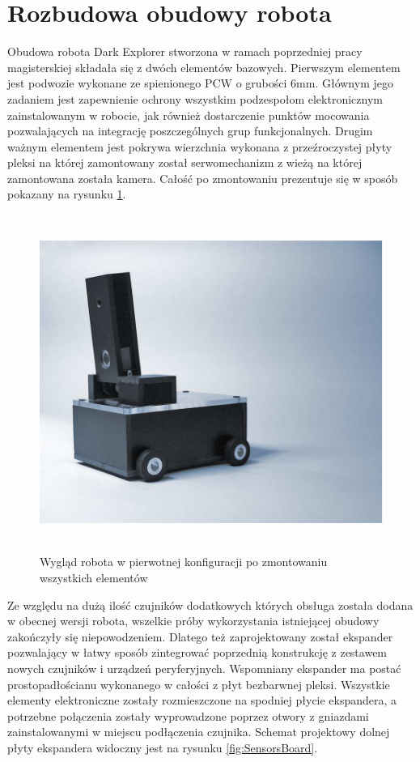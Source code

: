 \section{Rozbudowa obudowy robota}
\label{sec:casing}
Obudowa robota Dark Explorer stworzona w ramach poprzedniej pracy magisterskiej
\cite{KmakMScThesis2009} składała się z dwóch elementów bazowych. Pierwszym
elementem jest podwozie wykonane ze spienionego PCW o grubości 6mm. Głównym jego
zadaniem jest zapewnienie ochrony wszystkim podzespołom elektronicznym
zainstalowanym w robocie, jak również dostarczenie punktów mocowania
pozwalających na integrację poszczególnych grup funkcjonalnych. Drugim ważnym
elementem jest pokrywa wierzchnia wykonana z przeźroczystej płyty pleksi na
której zamontowany został serwomechanizm z wieżą na której zamontowana została
kamera. Całość po zmontowaniu prezentuje się w sposób pokazany na rysunku
\ref{fig:DESideView}.

\begin{figure}[ht!]
 \centering
 \includegraphics[height=110mm]{../images/ch04/de_side_view.png}
 \caption{Wygląd robota w pierwotnej konfiguracji po zmontowaniu wszystkich elementów}
 \label{fig:DESideView}
\end{figure}

Ze względu na dużą ilość czujników dodatkowych których obsługa została dodana w
obecnej wersji robota, wszelkie próby wykorzystania istniejącej obudowy
zakończyły się niepowodzeniem. Dlatego też zaprojektowany został ekspander
pozwalający w łatwy sposób zintegrować poprzednią konstrukcję z zestawem nowych
czujników i urządzeń peryferyjnych. Wspomniany ekspander ma postać
prostopadłościanu wykonanego w całości z płyt bezbarwnej pleksi. 
Wszystkie elementy elektroniczne zostały rozmieszczone na spodniej płycie
ekspandera, a potrzebne połączenia zostały wyprowadzone poprzez otwory z
gniazdami zainstalowanymi w miejscu podłączenia czujnika. Schemat projektowy
dolnej płyty ekspandera widoczny jest na rysunku \ref{fig:SensorsBoard}.

